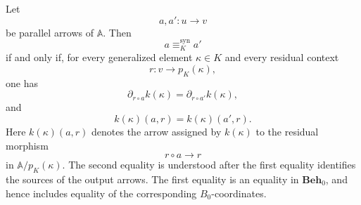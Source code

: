 \begin{theorem}
\label{thm:context-expansion}
    Let
    \[
        a,a':u\to v
    \]
    be parallel arrows of \(\mathbb A\). Then
    \[
        a\equiv^{\mathrm{syn}}_K a'
    \]
    if and only if, for every generalized element \(\kappa\in K\) and every
    residual context
    \[
        r:v\to p_K(\kappa),
    \]
    one has
    \[
        \partial_{r\circ a}k(\kappa)
        =
        \partial_{r\circ a'}k(\kappa),
    \]
    and
    \[
        k(\kappa)(a,r)=k(\kappa)(a',r).
    \]
    Here \(k(\kappa)(a,r)\) denotes the arrow assigned by \(k(\kappa)\) to the
    residual morphism
    \[
        r\circ a\to r
    \]
    in \(\mathbb A/p_K(\kappa)\). The second equality is understood after the
    first equality identifies the sources of the output arrows. The first
    equality is an equality in \(\mathbf{Beh}_0\), and hence includes equality
    of the corresponding \(B_0\)-coordinates.
\end{theorem}

